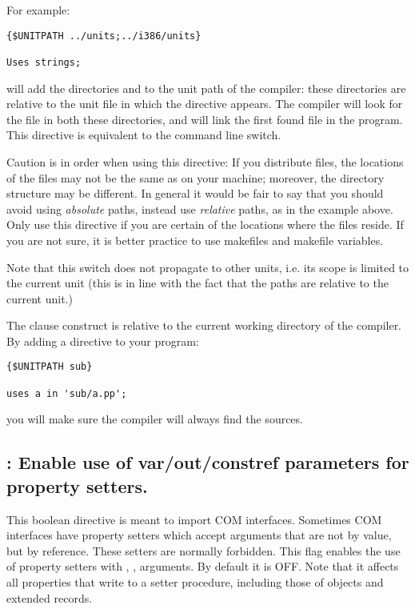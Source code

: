 For example:
\begin{verbatim}
{$UNITPATH ../units;../i386/units}

Uses strings;
\end{verbatim}

will add the directories  and  to the unit
path of the compiler: these directories are relative to the unit file in
which the directive appears. The compiler will look for the file 
in both these directories, and will link the first found file in the
program. This directive is equivalent to the  command line switch.

Caution is in order when using this directive: If you distribute files, the
locations of the files may not be the same as on your machine; moreover, the
directory structure may be different. In general it would be fair to say
that you should avoid using {\em absolute} paths, instead use {\em relative}
paths, as in the example above. Only use this directive if you are certain
of the locations where the files reside. If you are not sure, it is better
practice to use makefiles and makefile variables.

Note that this switch does not propagate to other units, i.e. its scope
is limited to the current unit (this is in line with the fact that the paths
are relative to the current unit.)

The  clause construct  is relative to the 
current working directory of the compiler. By adding a directive to your
program:
\begin{verbatim}
{$UNITPATH sub}

uses a in 'sub/a.pp';
\end{verbatim}
you will make sure the compiler will always find the sources.

\subsection{ : Enable use of var/out/constref
parameters for property setters.}
This boolean directive is meant to import COM interfaces. Sometimes COM
interfaces have property setters which accept arguments that are not by
value, but by reference. These setters are normally forbidden. This flag
enables the use of property setters with , , 
arguments. By default it is OFF. Note that it affects all properties that 
write to a setter procedure, including those of objects and extended records.

